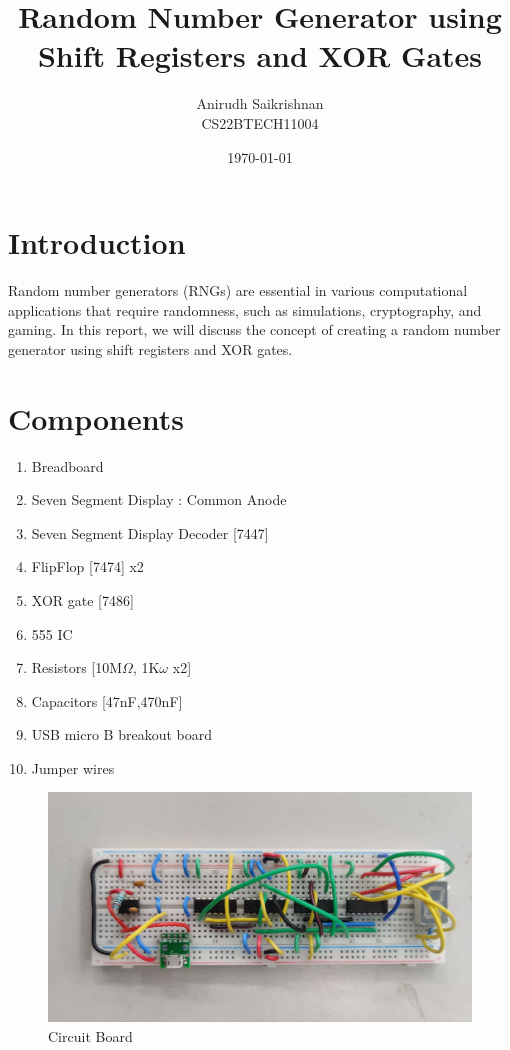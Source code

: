 \documentclass{article}
\title{Random Number Generator using Shift Registers and XOR Gates}
\author{Anirudh Saikrishnan \\ CS22BTECH11004}
\date{\today}
\begin{document}
\maketitle

\section{Introduction}

Random number generators (RNGs) are essential in various computational applications that require randomness, such as simulations, cryptography, and gaming. In this report, we will discuss the concept of creating a random number generator using shift registers and XOR gates.

\section{Components}
\begin{enumerate}    
    \item Breadboard
    \item Seven Segment Display : Common Anode
    \item Seven Segment Display Decoder [7447]
    \item FlipFlop [7474] x2
    \item XOR gate [7486]
    \item 555 IC
    \item Resistors [10M$\Omega$, 1K$\omega$ x2]
    \item Capacitors [47nF,470nF]
    \item USB micro B breakout board
    \item Jumper wires
\end{enumerate}

\begin{figure}[ht]
        \centering
        \includegraphics[width=1\linewidth]{CircuitBoard.jpeg}
        \caption{Circuit Board}
        \label{fig:view}
\end{figure}
\end{document}
